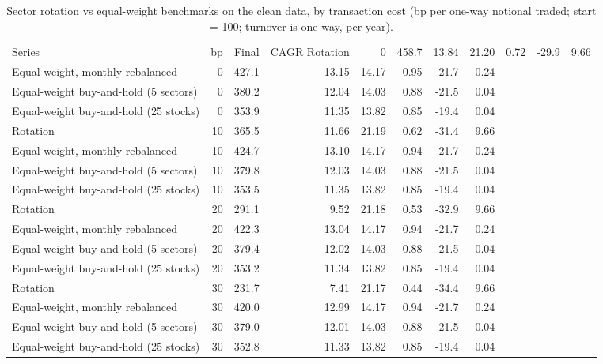 \begin{table}[ht]
\centering
\small
\caption{Sector rotation vs equal-weight benchmarks on the clean data, by transaction cost (bp per one-way notional traded; start = 100; turnover is one-way, per year).}
\label{tab:backtest-costs}
\begin{tabular}{lrrrrrrr}
\toprule
Series & bp & Final & CAGR %
\midrule
Rotation & 0 & 458.7 & 13.84 & 21.20 & 0.72 & -29.9 & 9.66 \\
Equal-weight, monthly rebalanced & 0 & 427.1 & 13.15 & 14.17 & 0.95 & -21.7 & 0.24 \\
Equal-weight buy-and-hold (5 sectors) & 0 & 380.2 & 12.04 & 14.03 & 0.88 & -21.5 & 0.04 \\
Equal-weight buy-and-hold (25 stocks) & 0 & 353.9 & 11.35 & 13.82 & 0.85 & -19.4 & 0.04 \\
Rotation & 10 & 365.5 & 11.66 & 21.19 & 0.62 & -31.4 & 9.66 \\
Equal-weight, monthly rebalanced & 10 & 424.7 & 13.10 & 14.17 & 0.94 & -21.7 & 0.24 \\
Equal-weight buy-and-hold (5 sectors) & 10 & 379.8 & 12.03 & 14.03 & 0.88 & -21.5 & 0.04 \\
Equal-weight buy-and-hold (25 stocks) & 10 & 353.5 & 11.35 & 13.82 & 0.85 & -19.4 & 0.04 \\
Rotation & 20 & 291.1 & 9.52 & 21.18 & 0.53 & -32.9 & 9.66 \\
Equal-weight, monthly rebalanced & 20 & 422.3 & 13.04 & 14.17 & 0.94 & -21.7 & 0.24 \\
Equal-weight buy-and-hold (5 sectors) & 20 & 379.4 & 12.02 & 14.03 & 0.88 & -21.5 & 0.04 \\
Equal-weight buy-and-hold (25 stocks) & 20 & 353.2 & 11.34 & 13.82 & 0.85 & -19.4 & 0.04 \\
Rotation & 30 & 231.7 & 7.41 & 21.17 & 0.44 & -34.4 & 9.66 \\
Equal-weight, monthly rebalanced & 30 & 420.0 & 12.99 & 14.17 & 0.94 & -21.7 & 0.24 \\
Equal-weight buy-and-hold (5 sectors) & 30 & 379.0 & 12.01 & 14.03 & 0.88 & -21.5 & 0.04 \\
Equal-weight buy-and-hold (25 stocks) & 30 & 352.8 & 11.33 & 13.82 & 0.85 & -19.4 & 0.04 \\
\bottomrule
\end{tabular}
\end{table}
